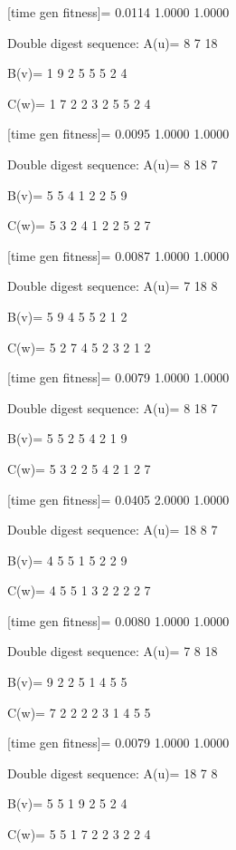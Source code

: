 [time gen fitness]=
    0.0114    1.0000    1.0000

Double digest sequence:
A(u)=
     8     7    18

B(v)=
     1     9     2     5     5     5     2     4

C(w)=
     1     7     2     2     3     2     5     5     2     4

[time gen fitness]=
    0.0095    1.0000    1.0000

Double digest sequence:
A(u)=
     8    18     7

B(v)=
     5     5     4     1     2     2     5     9

C(w)=
     5     3     2     4     1     2     2     5     2     7

[time gen fitness]=
    0.0087    1.0000    1.0000

Double digest sequence:
A(u)=
     7    18     8

B(v)=
     5     9     4     5     5     2     1     2

C(w)=
     5     2     7     4     5     2     3     2     1     2

[time gen fitness]=
    0.0079    1.0000    1.0000

Double digest sequence:
A(u)=
     8    18     7

B(v)=
     5     5     2     5     4     2     1     9

C(w)=
     5     3     2     2     5     4     2     1     2     7

[time gen fitness]=
    0.0405    2.0000    1.0000

Double digest sequence:
A(u)=
    18     8     7

B(v)=
     4     5     5     1     5     2     2     9

C(w)=
     4     5     5     1     3     2     2     2     2     7

[time gen fitness]=
    0.0080    1.0000    1.0000

Double digest sequence:
A(u)=
     7     8    18

B(v)=
     9     2     2     5     1     4     5     5

C(w)=
     7     2     2     2     2     3     1     4     5     5

[time gen fitness]=
    0.0079    1.0000    1.0000

Double digest sequence:
A(u)=
    18     7     8

B(v)=
     5     5     1     9     2     5     2     4

C(w)=
     5     5     1     7     2     2     3     2     2     4

